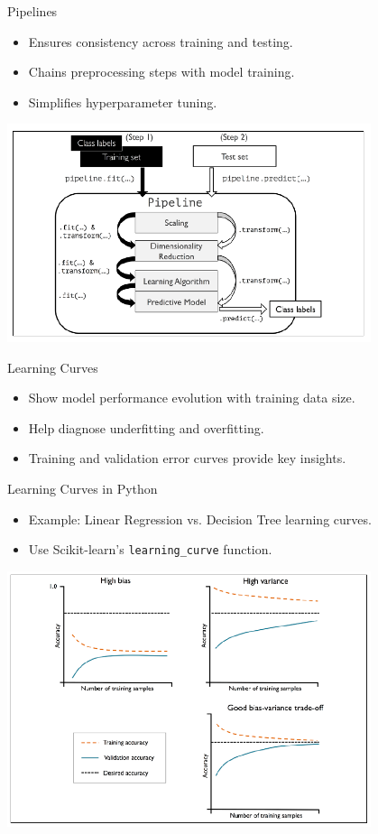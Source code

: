 \documentclass[11pt]{beamer}
\begin{document}
\begin{frame}{Pipelines}
    \begin{itemize}
        \item Ensures consistency across training and testing.
        \item Chains preprocessing steps with model training.
        \item Simplifies hyperparameter tuning.
    \end{itemize}
    \includegraphics[width=0.8\textwidth]{../05-pictures/lesson-4-2_pic_2.png}
\end{frame}

\begin{frame}{Learning Curves}
    \begin{itemize}
        \item Show model performance evolution with training data size.
        \item Help diagnose underfitting and overfitting.
        \item Training and validation error curves provide key insights.
    \end{itemize}
\end{frame}

\begin{frame}{Learning Curves in Python}
    \begin{itemize}
        \item Example: Linear Regression vs. Decision Tree learning curves.
        \item Use Scikit-learn's \texttt{learning\_curve} function.
    \end{itemize}
    \includegraphics[width=0.8\textwidth]{../05-pictures/lesson-4-2_pic_3.png}
\end{frame}
\end{document}
